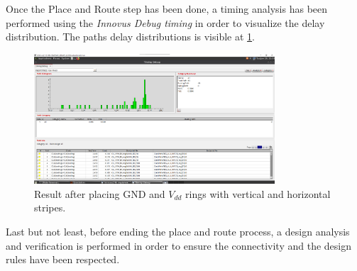 Once the Place and Route step has been done, a timing analysis has been performed using the \textit{Innovus Debug timing} in order to visualize the delay distribution. The paths delay distributions is visible at \ref{fig:innovus_delay}.
\begin{figure}[h]   
	\centering
	\includegraphics[width=0.8\textwidth]{chapters/9_PhysicalDesign/images/innvous_delay.png}
	\caption{Result after placing GND and $V_{dd}$ rings with vertical and horizontal stripes.}
	\label{fig:innovus_delay}
\end{figure}

Last but not least, before ending the place and route process, a design analysis and verification is performed in order to ensure the connectivity and the design rules have been respected.